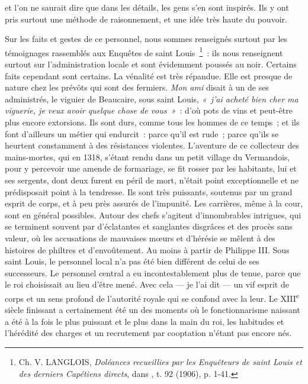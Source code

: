 \documentclass[french,twoside]{book} %
\begin{document}
\label{p42} et l’on ne saurait dire que dans les détails, les gens s’en sont inspirés. Ils y ont pris surtout une méthode de raisonnement, et une idée très haute du pouvoir.\par
Sur les faits et gestes de ce personnel, nous sommes renseignés surtout par les témoignages rassemblés aux Enquêtes de saint Louis \footnote{ Ch. V. LANGLOIS, {\itshape Doléances recueillies par les Enquêteurs de saint Louis et des derniers Capétiens directs}, dans \href{http://gallica.bnf.fr/document?O=N018186}{}, t. 92 (1906), p. 1-41.} : ils nous renseignent surtout sur l’administration locale et sont évidemment poussés au noir. Certains faits cependant sont certains. La vénalité est très répandue. Elle est presque de nature chez les prévôts qui sont des fermiers. \emph{Mon ami} disait à un de ses administrés, le viguier de Beaucaire, sous saint Louis, \emph{« j’ai acheté bien cher ma viguerie, je veux avoir quelque chose de vous »} : d’où pots de vins et peut-être plus encore extorsions. Ils sont durs, comme tous les hommes de ce temps ; et ils font d’ailleurs un métier qui endurcit : parce qu’il est rude ; parce qu’ils se heurtent constamment à des résistances violentes. L’aventure de ce collecteur des mains-mortes, qui en 1318, s’étant rendu dans un petit village du Vermandois, pour y percevoir une amende de formariage, se fit rosser par les habitants, lui et ses sergents, dont deux furent en péril de mort, n’était point exceptionnelle et ne prédisposait point à la tendresse. Ils sont très puissants, soutenus par un grand esprit de corps, et à peu près assurés de l’impunité. Les carrières, même à la cour, sont en général possibles. Autour des chefs s’agitent d’innombrables intrigues, qui se terminent souvent par d’éclatantes et sanglantes disgrâces et des procès sans valeur, où les accusations de mauvaises mœurs et d’hérésie se mêlent à des histoires de philtres et d’envoûtement. Au moins à partir de Philippe III. Sous saint Louis, le personnel local n’a pas été bien différent de celui de ses successeurs. Le personnel central a eu incontestablement plus de tenue, parce que le roi choisissait au lieu d’être mené. Avec cela — je l’ai dit — un vif esprit de corps et un sens profond de l’autorité royale qui se confond avec la leur. Le XIII\textsuperscript{e} siècle finissant a certainement été un des moments où le fonctionnarisme naissant a été à la fois le plus puissant et le plus dans la main du roi, les habitudes et l’hérédité des charges et un recrutement par cooptation n’étant pas encore nés.
\end{document}
